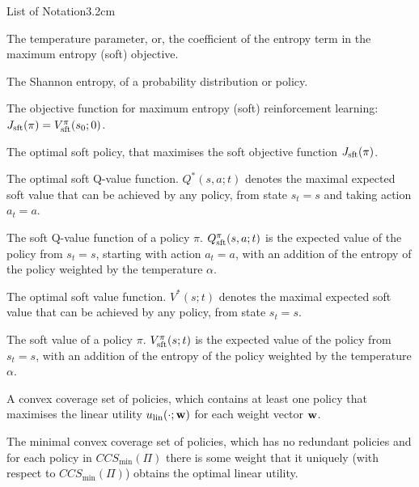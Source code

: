 \begin{mclistof}{List of Notation}{3.2cm}
    \item[{\parbox[t]{\textwidth}{
        \Large\textbf{Maximum Entropy Reinforcement Learning \\(Section \ref{sec:2-3-1-merl})}\hfill\hfill
      }}]
    \item[$\alpha$] 
        The temperature parameter, or, the coefficient of the entropy term in the maximum entropy (soft) objective.
    \item[$\cl{H}$]
        The Shannon entropy, of a probability distribution or policy.
    \item[$J_{\sft}(\pi)$] 
        The objective function for maximum entropy (soft) reinforcement learning: $J_{{\textnormal{sft}}}(\pi) = V_{{\textnormal{sft}}}^{\pi}(s_0;0)$.
    \item[$\pi_{\sft}^*$]
        The optimal soft policy, that maximises the soft objective function $J_{\sft}(\pi)$.
    \item[$Q_{\sft}^*$]
        The optimal soft Q-value function. $Q^*(s,a;t)$ denotes the maximal expected soft value that can be achieved by any policy, from state $s_t=s$ and taking action $a_t=a$. 
    \item[$Q_{\sft}^{\pi}$]
        The soft Q-value function of a policy $\pi$. $Q_{{\textnormal{sft}}}^{\pi}(s,a;t)$ is the expected value of the policy from $s_t=s$, starting with action $a_t=a$, with an addition of the entropy of the policy weighted by the temperature $\alpha$.
    \item[$V_{\sft}^*$]
        The optimal soft value function. $V^*(s;t)$ denotes the maximal expected soft value that can be achieved by any policy, from state $s_t=s$. 
    \item[$V_{\sft}^{\pi}$]
        The soft value of a policy $\pi$. $V_{{\textnormal{sft}}}^{\pi}(s;t)$ is the expected value of the policy from $s_t=s$, with an addition of the entropy of the policy weighted by the temperature $\alpha$.
    \\
    \item[{\parbox[t]{\textwidth}{
        \Large\textbf{Multi-Objective Reinforcement Learning \\(Section \ref{sec:2-5-morl})}\hfill\hfill
      }}]
    \item[$CCS(\Pi)$] 
        A convex coverage set of policies, which contains at least one policy that maximises the linear utility $u_{{\textnormal{lin}}}(\cdot;\mathbf{w})$ for each weight vector $\mathbf{w}$.
    \item[$CCS_{\min}(\Pi)$]
        The minimal convex coverage set of policies, which has no redundant policies and for each policy in $CCS_{\min}(\Pi)$ there is some weight that it uniquely (with respect to $CCS_{\min}(\Pi)$) obtains the optimal linear utility.

\end{mclistof}
